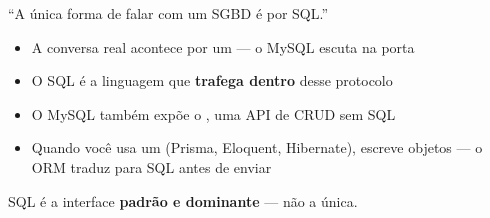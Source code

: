\begin{frame}{}
  \vspace{1.5em}
  \begin{center}
    {\large\lexendlight\textcolor{codecomment}{``A única forma de falar com um SGBD é por SQL.''}}

    \vspace{1em}
    {\Large{}}
  \end{center}

  \vspace{1.2em}
  \begin{itemize}
    \item A conversa real acontece por um  — o MySQL escuta na porta 
    \item O SQL é a linguagem que \textbf{trafega dentro} desse protocolo
    \item O MySQL também expõe o , uma API de CRUD sem SQL
    \item Quando você usa um  (Prisma, Eloquent, Hibernate), escreve objetos — o ORM traduz para SQL antes de enviar
  \end{itemize}

  \vspace{0.8em}
  \begin{center}
    {\small SQL é a interface \textbf{padrão e dominante} — não a única.}
  \end{center}

\end{frame}

